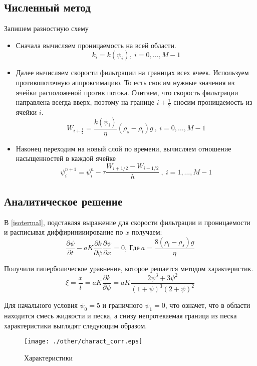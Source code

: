 \documentclass[12pt,a4paper]{article}
\newcommand{\pd}[2]{\frac{\partial #1}{\partial #2}}
\begin{document}
\subsection{Численный метод}
Запишем разностную схему
\begin{itemize}
\item Сначала вычисляем проницаемость на всей области.
\begin{equation}
k_i = k(\psi_i) , \ i = 0,  \dots ,M-1
\label{perm_razn}
\end{equation}

\item Далее вычисляем скорости фильтрации на границах всех ячеек. Используем противопоточную аппроксимацию. То есть сносим нужные значения из ячейки расположеной против потока. Считаем, что скорость фильтрации направлена всегда вверх, поэтому на границе $i + \frac12$ сносим проницаемость из ячейки $i$.
\begin{equation}
W_{i+\frac12} = \frac{k(\psi_i)}{\eta}(\rho_s-\rho_l)g \ , \ i = 0,  \dots ,M-1
\label{Darsi_razn}
\end{equation}

\item Наконец переходим на новый слой по времени, вычисляем отношение насыщенностей в каждой ячейке
\begin{equation}
\psi_i^{n+1} = \psi_i^n - \tau\frac{W_{i+1/2} - W_{i-1/2}}{h} \ , \ i = 1,  \dots ,M-1
\label{filtr_razn}
\end{equation}
\end{itemize}

\subsection{Аналитическое решение}
В \eqref{isotermal}, подставляя выражение для скорости фильтрации и проницаемости и расписывая диффиринииирование по $x$ получаем:
\begin{equation}
\pd{\psi}{t} - a K \pd{k}{\psi} \pd{\psi}{x} = 0,\  \text{Где}\ a = \frac{8(\rho_l-\rho_s)g}{\eta}
\label{characteristics}
\end{equation}

Получили гиперболическое уравнение, которое решается методом характеристик. 
$$
\xi = \frac{x}{t} = a K \pd{k}{\psi} =   a K \frac{2\psi^3 + 3\psi^2}{(1 + \psi)^3(2+\psi)^2}
$$

Для начального условия $\psi_0 = 5$ и граничного $\psi_1 = 0$, что означет, что в области находится смесь жидкости и песка, а снизу непротекаемая граница из песка характеристики выглядят следующим образом.
\begin{figure}[h!]
\begin{center}
\texttt{[image: ./other/charact\_corr.eps]}
\caption{Характеристики}
\end{center}
\end{figure}
\end{document}
